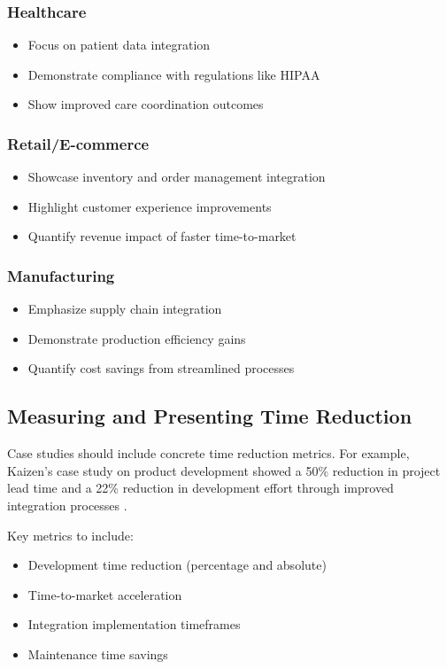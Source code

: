 \documentclass[11pt,a4paper]{article}
\begin{document}
\subsubsection{Healthcare}
\begin{itemize}
    \item Focus on patient data integration
    \item Demonstrate compliance with regulations like HIPAA
    \item Show improved care coordination outcomes
\end{itemize}

\subsubsection{Retail/E-commerce}
\begin{itemize}
    \item Showcase inventory and order management integration
    \item Highlight customer experience improvements
    \item Quantify revenue impact of faster time-to-market
\end{itemize}

\subsubsection{Manufacturing}
\begin{itemize}
    \item Emphasize supply chain integration
    \item Demonstrate production efficiency gains
    \item Quantify cost savings from streamlined processes
\end{itemize}

\subsection{Measuring and Presenting Time Reduction}

Case studies should include concrete time reduction metrics. For example, Kaizen's case study on product development showed a 50\% reduction in project lead time and a 22\% reduction in development effort through improved integration processes \citep{KaizenInstitute2021LeadTimeReduction}.

Key metrics to include:
\begin{itemize}
    \item Development time reduction (percentage and absolute)
    \item Time-to-market acceleration
    \item Integration implementation timeframes
    \item Maintenance time savings
\end{itemize}
\end{document}
